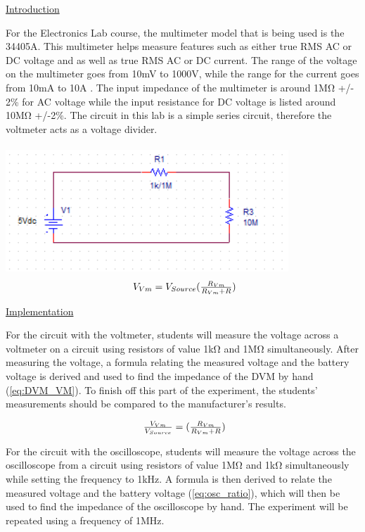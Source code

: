 \documentclass[a4paper,10pt]{article}
\begin{document}
\underline{Introduction}

For the Electronics Lab course, the multimeter model that is being used is the 34405A. This multimeter helps measure features such as either true RMS AC or DC voltage and as well as true RMS AC or DC current. The range of the voltage on the multimeter goes from 10mV to 1000V, while the range for the current goes from 10mA to 10A \cite{34405A:3}. The input impedance of the multimeter is around 1M\si{\ohm} +/- 2\% for AC voltage while the input resistance for DC voltage is listed around 10M\si{\ohm} +/-2\%\cite{34405A:6}. The circuit in this lab is a simple series circuit, therefore the voltmeter acts as a voltage divider.\\
\\

\includegraphics{voltmeterfinal.png}
\label{Voltmeter_Pic}
\begin{equation}
\label{eq:volt_div}
\centerline{ $ V_{Vm} = V_{Source}(\frac{R_{Vm}}{R_{Vm} + R}) $} 
\end{equation}


\underline{Implementation}

For the circuit with the voltmeter, students will measure the  voltage across a voltmeter on a circuit using resistors of value 1kΩ and 1MΩ simultaneously. After measuring the voltage, a formula relating the measured voltage and the battery voltage is derived and used to find the impedance of the DVM by hand (\ref{eq:DVM_VM}). To finish off this part of the experiment, the students’ measurements should be compared to the manufacturer's results. 

\begin{equation}
\label{eq:DVM_VM}
\centerline{ $ \frac{V_{Vm}}{V_{Source}} = (\frac{R_{Vm}}{R_{Vm} + R}) $} 
\end{equation}


For the circuit with the oscilloscope, students will measure the voltage across the oscilloscope from a circuit using resistors of value 1MΩ and 1kΩ simultaneously while setting the frequency to 1kHz. A formula is then derived to relate the measured voltage and the battery voltage (\ref{eq:osc_ratio}), which will then be used to find the impedance of the oscilloscope by hand. The experiment will be repeated using a frequency of 1MHz.
\end{document}
